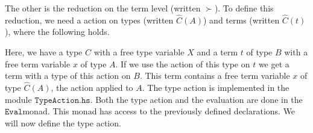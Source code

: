 \documentclass[a4paper,cleardoubleempty,BCOR1cm]{scrbook}
\begin{document}
The other is the reduction on the term level (written $\mathtt{\succ}$). To define this
reduction, we need a action on types (written \(\widehat{C}(A)\)) and terms
(written \(\widehat{C}(t)\)), where the following holds.
\begin{prooftree}
\end{prooftree}
Here, we have a type \(C\) with a free type variable \(X\) and a term \(t\) of type
\(B\) with a free term variable \(x\) of type \(A\). If we use the action of this
type on \(t\) we get a term with a type of this action on \(B\). This term
contains a free term variable \(x\) of type \(\widehat{C}(A)\), the action applied to \(A\). The
type action is implemented in the module $\mathtt{TypeAction.hs}$. Both the type
action and the evaluation are done in the $\mathtt{Eval}$\;monad. This monad has access
to the previously defined declarations. We will now define the type action.
\end{document}
